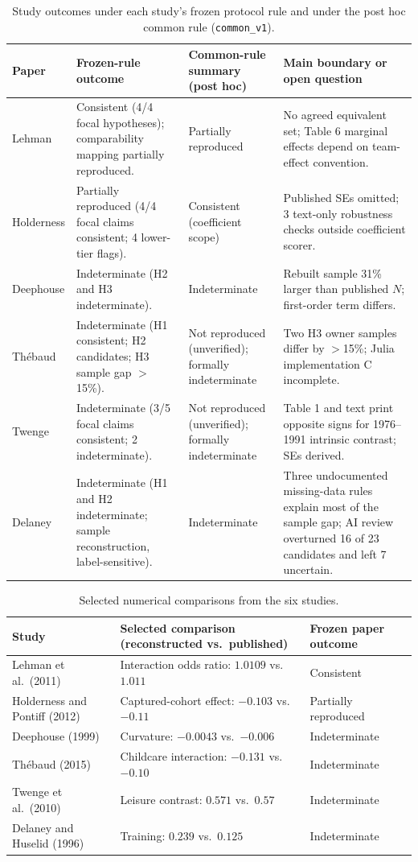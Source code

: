 \documentclass[11pt]{article}
\begin{document}
\begin{table}[H]\centering\small
\begin{tabularx}{\linewidth}{@{}lYYY@{}}\toprule
Paper & Frozen-rule outcome & Common-rule summary (post hoc) & Main boundary or open question\\\midrule
Lehman & Consistent (4/4 focal hypotheses); comparability mapping partially reproduced. & Partially reproduced & No agreed equivalent set; Table 6 marginal effects depend on team-effect convention.\\
Holderness & Partially reproduced (4/4 focal claims consistent; 4 lower-tier flags). & Consistent (coefficient scope) & Published SEs omitted; 3 text-only robustness checks outside coefficient scorer.\\
Deephouse & Indeterminate (H2 and H3 indeterminate). & Indeterminate & Rebuilt sample 31\% larger than published $N$; first-order term differs.\\
Th\'ebaud & Indeterminate (H1 consistent; H2 candidates; H3 sample gap $>$15\%). & Not reproduced (unverified); formally indeterminate & Two H3 owner samples differ by $>$15\%; Julia implementation C incomplete.\\
Twenge & Indeterminate (3/5 focal claims consistent; 2 indeterminate). & Not reproduced (unverified); formally indeterminate & Table 1 and text print opposite signs for 1976--1991 intrinsic contrast; SEs derived.\\
Delaney & Indeterminate (H1 and H2 indeterminate; sample reconstruction, label-sensitive). & Indeterminate & Three undocumented missing-data rules explain most of the sample gap; AI review overturned 16 of 23 candidates and left 7 uncertain.\\\bottomrule
\end{tabularx}\caption{Study outcomes under each study's frozen protocol rule and under the post hoc common rule (\texttt{common\_v1}).}\end{table}
\begin{table}[H]\centering\small
\begin{tabularx}{\linewidth}{@{}p{.21\linewidth}Yp{.20\linewidth}@{}}\toprule
Study & Selected comparison (reconstructed vs.\ published) & Frozen paper outcome\\\midrule
Lehman et al.\ (2011) & Interaction odds ratio: $1.0109$ vs.\ $1.011$ & Consistent\\
Holderness and Pontiff (2012) & Captured-cohort effect: $-0.103$ vs.\ $-0.11$ & Partially reproduced\\
Deephouse (1999) & Curvature: $-0.0043$ vs.\ $-0.006$ & Indeterminate\\
Th\'ebaud (2015) & Childcare interaction: $-0.131$ vs.\ $-0.10$ & Indeterminate\\
Twenge et al.\ (2010) & Leisure contrast: $0.571$ vs.\ $0.57$ & Indeterminate\\
Delaney and Huselid (1996) & Training: $0.239$ vs.\ $0.125$ & Indeterminate\\\bottomrule
\end{tabularx}\caption{Selected numerical comparisons from the six studies.}\label{tab:cases}\end{table}
\end{document}
